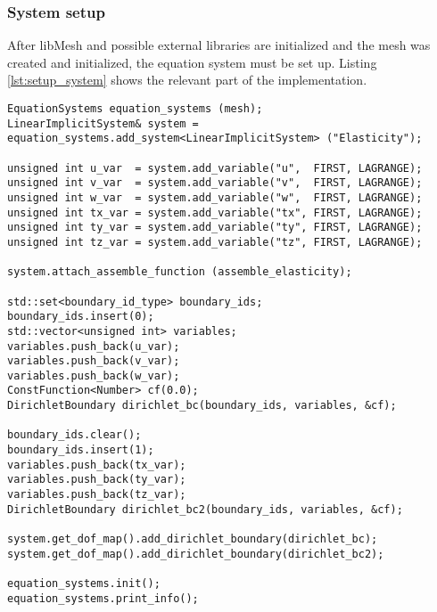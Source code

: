   \subsubsection{System setup}\label{sec:Impl-Details-SystemSetup}
  After libMesh and possible external libraries are initialized and the mesh was created and initialized, the equation system must be set up. Listing \ref{lst:setup_system} shows the relevant part of the implementation.
\begin{lstlisting}[caption=Setting up the equation system,label=lst:setup_system,keepspaces=true]
EquationSystems equation_systems (mesh);
LinearImplicitSystem& system = equation_systems.add_system<LinearImplicitSystem> ("Elasticity");

unsigned int u_var  = system.add_variable("u",  FIRST, LAGRANGE);
unsigned int v_var  = system.add_variable("v",  FIRST, LAGRANGE);
unsigned int w_var  = system.add_variable("w",  FIRST, LAGRANGE);
unsigned int tx_var = system.add_variable("tx", FIRST, LAGRANGE);
unsigned int ty_var = system.add_variable("ty", FIRST, LAGRANGE);
unsigned int tz_var = system.add_variable("tz", FIRST, LAGRANGE);

system.attach_assemble_function (assemble_elasticity);

std::set<boundary_id_type> boundary_ids;
boundary_ids.insert(0);
std::vector<unsigned int> variables;
variables.push_back(u_var);
variables.push_back(v_var);
variables.push_back(w_var);
ConstFunction<Number> cf(0.0);
DirichletBoundary dirichlet_bc(boundary_ids, variables, &cf);

boundary_ids.clear();
boundary_ids.insert(1);
variables.push_back(tx_var);
variables.push_back(ty_var);
variables.push_back(tz_var);
DirichletBoundary dirichlet_bc2(boundary_ids, variables, &cf);

system.get_dof_map().add_dirichlet_boundary(dirichlet_bc);
system.get_dof_map().add_dirichlet_boundary(dirichlet_bc2);

equation_systems.init();
equation_systems.print_info();
\end{lstlisting}
